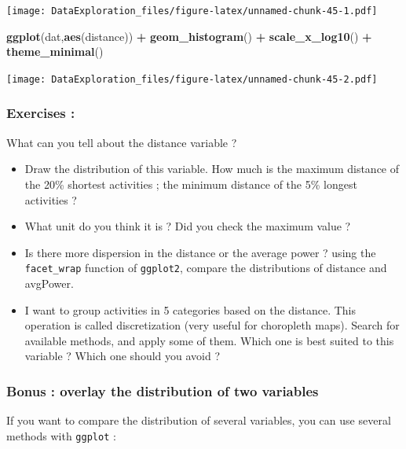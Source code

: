 \documentclass[
]{book}
\newenvironment{Shaded}{\begin{snugshade}}{\end{snugshade}}
\newcommand{\KeywordTok}[1]{\textcolor[rgb]{0.13,0.29,0.53}{\textbf{#1}}}
\newcommand{\NormalTok}[1]{#1}
\newcommand{\OperatorTok}[1]{\textcolor[rgb]{0.81,0.36,0.00}{\textbf{#1}}}
\newcommand{\StringTok}[1]{\textcolor[rgb]{0.31,0.60,0.02}{#1}}
\providecommand{\tightlist}{%
  \setlength{\itemsep}{0pt}\setlength{\parskip}{0pt}}
\begin{document}
\texttt{[image: DataExploration\_files/figure-latex/unnamed-chunk-45-1.pdf]}

\begin{Shaded}
\begin{Highlighting}[]
\KeywordTok{ggplot}\NormalTok{(dat,}\KeywordTok{aes}\NormalTok{(distance)) }\OperatorTok{+}\StringTok{ }\KeywordTok{geom_histogram}\NormalTok{() }\OperatorTok{+}\StringTok{ }\KeywordTok{scale_x_log10}\NormalTok{() }\OperatorTok{+}\StringTok{ }\KeywordTok{theme_minimal}\NormalTok{()}
\end{Highlighting}
\end{Shaded}

\texttt{[image: DataExploration\_files/figure-latex/unnamed-chunk-45-2.pdf]}

\hypertarget{exercises}{%
\subsubsection{Exercises :}\label{exercises}}

What can you tell about the distance variable ?

\begin{itemize}
\tightlist
\item
  Draw the distribution of this variable. How much is the maximum distance of the 20\% shortest activities ; the minimum distance of the 5\% longest activities ?
\item
  What unit do you think it is ? Did you check the maximum value ?
\item
  Is there more dispersion in the distance or the average power ? using the \texttt{facet\_wrap} function of \texttt{ggplot2}, compare the distributions of distance and avgPower.
\item
  I want to group activities in 5 categories based on the distance. This operation is called discretization (very useful for choropleth maps). Search for available methods, and apply some of them. Which one is best suited to this variable ? Which one should you avoid ?
\end{itemize}

\hypertarget{bonus-overlay-the-distribution-of-two-variables}{%
\subsubsection{Bonus : overlay the distribution of two variables}\label{bonus-overlay-the-distribution-of-two-variables}}

If you want to compare the distribution of several variables, you can use several methods with \texttt{ggplot} :
\end{document}
